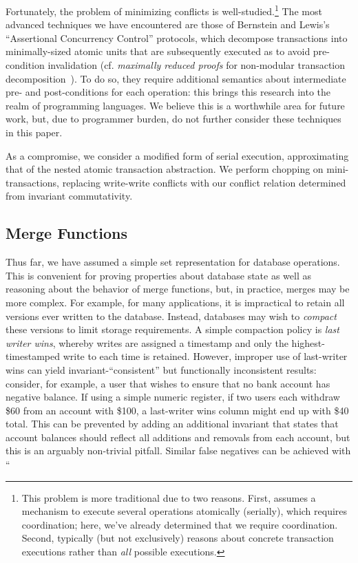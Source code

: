 Fortunately, the problem of minimizing conflicts is
well-studied.\footnote{This problem is more traditional due to two
  reasons. First, assumes a mechanism to execute several operations
  atomically (serially), which requires coordination; here, we've
  already determined that we require coordination. Second, typically
  (but not exclusively) reasons about concrete transaction executions
  rather than \textit{all} possible executions.} The most advanced
techniques we have encountered are those of Bernstein and Lewis's
``Assertional Concurrency Control'' protocols, which decompose
transactions into minimally-sized atomic units that are subsequently
executed as to avoid pre-condition invalidation (cf. \textit{maximally
  reduced proofs} for non-modular transaction
decomposition~\cite{decomp-semantics}). To do so, they require
additional semantics about intermediate pre- and post-conditions for
each operation: this brings this research into the realm of
programming languages. We believe this is a worthwhile area for future
work, but, due to programmer burden, do not further consider these
techniques in this paper.

As a compromise, we consider a modified form of serial execution,
approximating that of the nested atomic transaction abstraction. We
perform chopping on mini-transactions, replacing write-write conflicts
with our conflict relation determined from invariant commutativity.



\subsection{Merge Functions}

Thus far, we have assumed a simple set representation for database
operations. This is convenient for proving properties about database
state as well as reasoning about the behavior of merge functions, but,
in practice, merges may be more complex. For example, for many
applications, it is impractical to retain all versions ever written to
the database. Instead, databases may wish to \textit{compact} these
versions to limit storage requirements. A simple compaction policy is
\textit{last writer wins}, whereby writes are assigned a timestamp and
only the highest-timestamped write to each time is retained. However,
improper use of last-writer wins can yield invariant-``consistent''
but functionally inconsistent results: consider, for example, a user
that wishes to ensure that no bank account has negative balance. If
using a simple numeric register, if two users each withdraw \$60 from
an account with \$100, a last-writer wins column might end up with
\$40 total. This can be prevented by adding an additional invariant
that states that account balances should reflect all additions and
removals from each account, but this is an arguably non-trivial
pitfall. Similar false negatives can be achieved with ``

